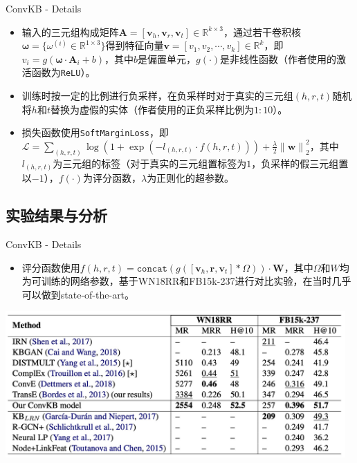 \begin{frame}[c]{ConvKB - Details}

\begin{itemize}
    \item 输入的三元组构成矩阵$\bm{A}=[\bm{v}_h,\bm{v}_r,\bm{v}_t]\in \mathbb{R}^{k\times 3}$，通过若干卷积核$\bm{\omega}=\{\omega^{(i)}\in \mathbb{R}^{1\times 3}\}$得到特征向量$\bm{v}=[v_1,v_2,\cdots,v_k]\in \mathbb{R}^k$，即$v_i=g(\bm{\omega\cdot A}_i+b)$，其中$b$是偏置单元，$g(\cdot)$是非线性函数（作者使用的激活函数为\texttt{ReLU}）。
    \item 训练时按一定的比例进行负采样，在负采样时对于真实的三元组$(h,r,t)$随机将$h$和$t$替换为虚假的实体（作者使用的正负采样比例为$1:10$）。
    \item 损失函数使用\texttt{SoftMarginLoss}，即$\mathcal{L}=\sum\limits_{(h,r,t)}\log(1+\exp(-l_{(h,r,t)}\cdot f(h,r,t)))+\frac{\lambda}{2}{\lVert \mathbf{w}\rVert}^2_2$，其中$l_{(h,r,t)}$为三元组的标签（对于真实的三元组置标签为$1$，负采样的假三元组置以$-1$），$f(\cdot)$为评分函数，$\lambda$为正则化的超参数。
\end{itemize}
    
\end{frame}


\subsection{实验结果与分析}

\begin{frame}[c]{ConvKB - Details}

\begin{itemize}
    \item 评分函数使用$f(h,r,t)=\texttt{concat}(g([\bm{v}_h,\bm{r},\bm{v}_t]*\Omega))\cdot \mathbf{W}$，其中$\Omega$和$W$均为可训练的网络参数，基于WN18RR和FB15k-237进行对比实验，在当时几乎可以做到state-of-the-art。
\end{itemize}

\begin{center}
    \includegraphics[width=13cm]{assets/9.png}
\end{center}

    
\end{frame}
